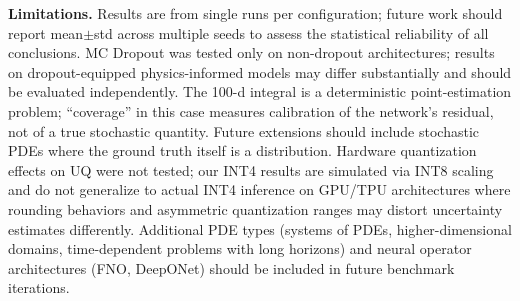 \documentclass[12pt,a4paper]{article}
\theoremstyle{plain}
\begin{document}
\textbf{Limitations.}  Results are from single runs per configuration;
future work should report mean$\pm$std across multiple seeds to assess
the statistical reliability of all conclusions. MC Dropout was tested only
on non-dropout architectures; results on dropout-equipped physics-informed
models may differ substantially and should be evaluated independently. The
100-d integral is a deterministic point-estimation problem; ``coverage''
in this case measures calibration of the network's residual, not of a true
stochastic quantity. Future extensions should include stochastic PDEs
where the ground truth itself is a distribution. Hardware quantization
effects on UQ were not tested; our INT4 results are simulated via INT8
scaling and do not generalize to actual INT4 inference on GPU/TPU
architectures where rounding behaviors and asymmetric quantization
ranges may distort uncertainty estimates differently. Additional PDE
types (systems of PDEs, higher-dimensional domains, time-dependent
problems with long horizons) and neural operator architectures
(FNO, DeepONet) should be included in future benchmark iterations.
\end{document}
